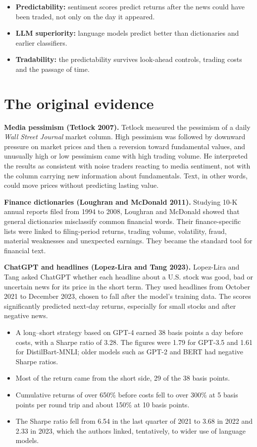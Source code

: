 \begin{itemize}
  \item \textbf{Predictability:} sentiment scores predict returns after the news could have been traded, not only on the day it appeared.
  \item \textbf{LLM superiority:} language models predict better than dictionaries and earlier classifiers.
  \item \textbf{Tradability:} the predictability survives look-ahead controls, trading costs and the passage of time.
\end{itemize}

\section{The original evidence}
\label{sec:23-evidence}

\textbf{Media pessimism (Tetlock 2007).} Tetlock measured the pessimism of a daily \emph{Wall Street Journal} market column. High pessimism was followed by downward pressure on market prices and then a reversion toward fundamental values, and unusually high or low pessimism came with high trading volume. He interpreted the results as consistent with noise traders reacting to media sentiment, not with the column carrying new information about fundamentals. Text, in other words, could move prices without predicting lasting value.

\textbf{Finance dictionaries (Loughran and McDonald 2011).} Studying 10-K annual reports filed from 1994 to 2008, Loughran and McDonald showed that general dictionaries misclassify common financial words. Their finance-specific lists were linked to filing-period returns, trading volume, volatility, fraud, material weaknesses and unexpected earnings. They became the standard tool for financial text.

\textbf{ChatGPT and headlines (Lopez-Lira and Tang 2023).} Lopez-Lira and Tang asked ChatGPT whether each headline about a U.S. stock was good, bad or uncertain news for its price in the short term. They used headlines from October 2021 to December 2023, chosen to fall after the model's training data. The scores significantly predicted next-day returns, especially for small stocks and after negative news.

\begin{itemize}
  \item A long--short strategy based on GPT-4 earned 38 basis points a day before costs, with a Sharpe ratio of 3.28. The figures were 1.79 for GPT-3.5 and 1.61 for DistilBart-MNLI; older models such as GPT-2 and BERT had negative Sharpe ratios.
  \item Most of the return came from the short side, 29 of the 38 basis points.
  \item Cumulative returns of over 650\% before costs fell to over 300\% at 5 basis points per round trip and about 150\% at 10 basis points.
  \item The Sharpe ratio fell from 6.54 in the last quarter of 2021 to 3.68 in 2022 and 2.33 in 2023, which the authors linked, tentatively, to wider use of language models.
\end{itemize}

